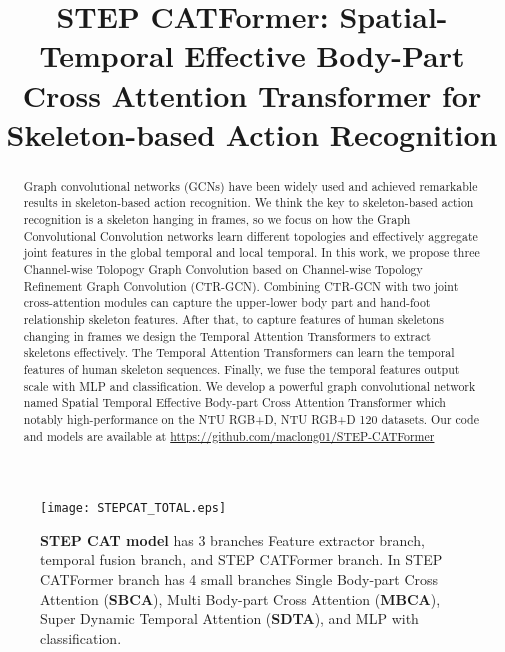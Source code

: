 \documentclass{bmvc2k}
\title{STEP CATFormer: Spatial-Temporal Effective Body-Part Cross Attention Transformer for Skeleton-based Action Recognition}
\begin{document}
\maketitle

\begin{abstract}
Graph convolutional networks (GCNs) have been widely used and achieved remarkable results in skeleton-based action recognition.
We think the key to skeleton-based action recognition is a skeleton hanging in frames, so we focus on how the Graph Convolutional Convolution networks learn different topologies and effectively aggregate joint features in the global temporal and local temporal. In this work, we propose three Channel-wise Tolopogy Graph Convolution based on Channel-wise Topology Refinement Graph Convolution (CTR-GCN). Combining CTR-GCN with two joint cross-attention modules can capture the upper-lower body part and hand-foot relationship skeleton features.
After that, to capture features of human skeletons changing in frames we design the Temporal Attention Transformers to extract skeletons effectively.
The Temporal Attention Transformers can learn the temporal features of human skeleton sequences. Finally, we fuse the temporal features output scale with MLP and classification. We develop a powerful graph convolutional network named Spatial Temporal Effective Body-part Cross Attention Transformer which notably high-performance on the NTU RGB+D, NTU RGB+D 120 datasets. Our code and models are available at \href{https://github.com/maclong01/STEP-CATFormer}{https://github.com/maclong01/STEP-CATFormer}
\end{abstract}





\begin{figure*}
\begin{center}
\texttt{[image: STEPCAT\_TOTAL.eps]}
\end{center}
   \caption{\textbf{STEP CAT model } has 3 branches Feature extractor branch, temporal fusion branch, and STEP CATFormer branch. In STEP CATFormer branch has 4 small branches Single Body-part Cross Attention (\textbf{SBCA}), Multi Body-part Cross Attention (\textbf{MBCA}), Super Dynamic Temporal Attention (\textbf{SDTA}), and MLP with classification.}
\label{fig-stepcat}
\end{figure*}
\end{document}
